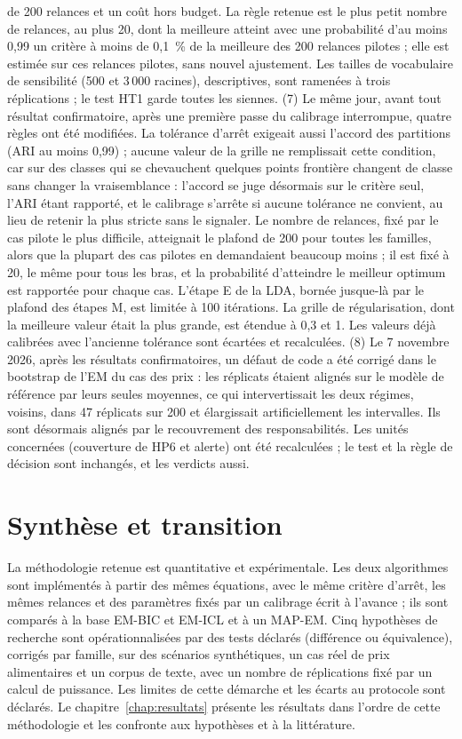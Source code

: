 de 200 relances et un coût hors budget. La règle retenue est le plus petit nombre de relances, au plus 20, dont la meilleure atteint avec une probabilité d'au moins 0,99 un critère à moins de 0,1~\% de la meilleure des 200 relances pilotes ; elle est estimée sur ces relances pilotes, sans nouvel ajustement. Les tailles de vocabulaire de sensibilité (500 et 3\,000 racines), descriptives, sont ramenées à trois réplications ; le test HT1 garde toutes les siennes. (7) Le même jour, avant tout résultat confirmatoire, après une première passe du calibrage interrompue, quatre règles ont été modifiées. La tolérance d'arrêt exigeait aussi l'accord des partitions (ARI au moins 0,99) ; aucune valeur de la grille ne remplissait cette condition, car sur des classes qui se chevauchent quelques points frontière changent de classe sans changer la vraisemblance : l'accord se juge désormais sur le critère seul, l'ARI étant rapporté, et le calibrage s'arrête si aucune tolérance ne convient, au lieu de retenir la plus stricte sans le signaler. Le nombre de relances, fixé par le cas pilote le plus difficile, atteignait le plafond de 200 pour toutes les familles, alors que la plupart des cas pilotes en demandaient beaucoup moins ; il est fixé à 20, le même pour tous les bras, et la probabilité d'atteindre le meilleur optimum est rapportée pour chaque cas. L'étape E de la LDA, bornée jusque-là par le plafond des étapes M, est limitée à 100 itérations. La grille de régularisation, dont la meilleure valeur était la plus grande, est étendue à 0,3 et 1. Les valeurs déjà calibrées avec l'ancienne tolérance sont écartées et recalculées. (8) Le 7 novembre 2026, après les résultats confirmatoires, un défaut de code a été corrigé dans le bootstrap de l'EM du cas des prix : les réplicats étaient alignés sur le modèle de référence par leurs seules moyennes, ce qui intervertissait les deux régimes, voisins, dans 47 réplicats sur 200 et élargissait artificiellement les intervalles. Ils sont désormais alignés par le recouvrement des responsabilités. Les unités concernées (couverture de HP6 et alerte) ont été recalculées ; le test et la règle de décision sont inchangés, et les verdicts aussi.

\section{Synthèse et transition}\label{sec:synthese_methodo}
La méthodologie retenue est quantitative et expérimentale. Les deux algorithmes sont implémentés à partir des mêmes équations, avec le même critère d'arrêt, les mêmes relances et des paramètres fixés par un calibrage écrit à l'avance ; ils sont comparés à la base EM-BIC et EM-ICL et à un MAP-EM. Cinq hypothèses de recherche sont opérationnalisées par des tests déclarés (différence ou équivalence), corrigés par famille, sur des scénarios synthétiques, un cas réel de prix alimentaires et un corpus de texte, avec un nombre de réplications fixé par un calcul de puissance. Les limites de cette démarche et les écarts au protocole sont déclarés. Le chapitre~\ref{chap:resultats} présente les résultats dans l'ordre de cette méthodologie et les confronte aux hypothèses et à la littérature.

